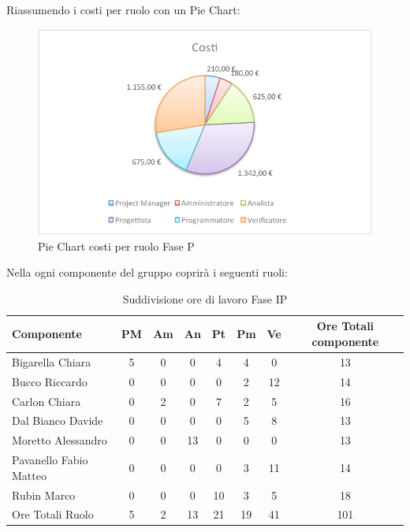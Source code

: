 				Riassumendo i costi per ruolo con un Pie Chart:
				\begin{figure}[H]\centering
					\includegraphics[width=\textwidth]{PianoDiProgetto/Pics/ChartTotCostiFaseP.pdf}
					\caption{Pie Chart costi per ruolo Fase P}
				\end{figure}
				Nella  ogni componente del gruppo \groupname{} coprirà i seguenti ruoli:
				\begin{table}[H]
					\begin{center}
						\begin{tabular}{| l | c | c | c | c | c | c | c |}
							\hline
							Componente 					& PM	& Am	& An 	& Pt 		& Pm 		& Ve 	& Ore Totali componente \\ \hline
							
							Bigarella Chiara 			& 5 	& 0		& 0		& 4			& 4 		& 0		& 13 \\
							Bucco Riccardo 				& 0		& 0		& 0		& 0			& 2			& 12 	& 14 \\
							Carlon Chiara	 			& 0		& 2 	& 0		& 7 		& 2 		& 5 	& 16 \\
							Dal Bianco Davide 			& 0		& 0		& 0		& 0			& 5 		& 8 	& 13 \\
							Moretto Alessandro 			& 0		& 0		& 13 	& 0			& 0			& 0		& 13 \\
							Pavanello Fabio Matteo	 	& 0		& 0		& 0		& 0			& 3 		&11 	& 14 \\
							Rubin Marco					& 0		& 0 	& 0		& 10 		& 3 		& 5		& 18 \\ \hline \hline
							
							Ore Totali Ruolo 			& 5 	& 2 	& 13 	& 21 		& 19 		& 41 	& 101\\ \hline
						\end{tabular}
					\end{center}
					\caption{Suddivisione ore di lavoro Fase IP}
				\end{table}
